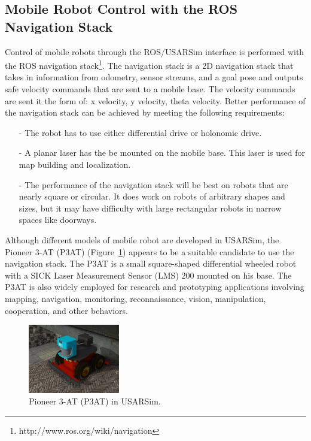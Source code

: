 \subsection*{Mobile Robot Control with the ROS Navigation Stack}
Control of mobile robots through the ROS/USARSim interface is performed with the ROS navigation stack\footnote{http://www.ros.org/wiki/navigation}. The navigation stack is a 2D navigation stack that takes in information from odometry, sensor streams, and a goal pose and outputs safe velocity commands that are sent to a mobile base. The velocity commands are sent it the form of: x velocity, y velocity, theta velocity. Better performance of the navigation stack can be achieved by meeting the following requirements:
\begin{itemize}
\item[-] The robot has to use either differential drive or holonomic drive.
\item[-] A planar laser has the be mounted on the mobile base. This laser is used for map building and localization.
\item[-] The performance of the navigation stack will be best on robots that are nearly square or circular. It does work on robots of arbitrary shapes and sizes, but it may have difficulty with large rectangular robots in narrow spaces like doorways.
\end{itemize}

Although different models of mobile robot are developed in USARSim, the Pioneer 3-AT (P3AT) (Figure~\ref{fig:p3at}) appears to be a suitable candidate to use the navigation stack. The P3AT is a small square-shaped differential wheeled robot with a SICK Laser Measurement Sensor (LMS) 200 mounted on his base. The P3AT is also widely employed for research and prototyping applications involving mapping, navigation, monitoring, reconnaissance, vision, manipulation, cooperation, and other behaviors.

\begin{figure}[t!]
\centering
\includegraphics[width=4cm]{Figures/Robots/p3at.jpg}
\caption{Pioneer 3-AT (P3AT) in USARSim.}\label{fig:p3at}
\end{figure}




